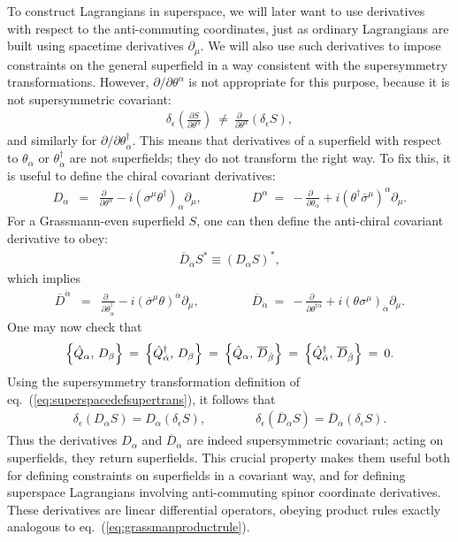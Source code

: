 \documentclass[11pt]{article}
\def\beq{\begin{eqnarray}}
\def\eeq{\end{eqnarray}}
\def\sigmabar{\overline\sigma}
\def\Dcon{\overline D}
\begin{document}
To construct Lagrangians in superspace, we will later want to use 
derivatives with respect to the anti-commuting coordinates, just as 
ordinary Lagrangians are built using spacetime derivatives 
$\partial_\mu$. We will also use such derivatives to impose constraints 
on the general superfield in a way consistent with the supersymmetry 
transformations. However, $
\partial
/
\partial\theta^\alpha
$ is not appropriate for 
this purpose, because it is not supersymmetric covariant:
\beq
\delta_\epsilon \left (\frac{\partial S}{\partial \theta^\alpha} \right )
\>\not=\>
\frac{\partial\phantom{x}}{\partial\theta^\alpha} (\delta_\epsilon S),
\eeq
and similarly for 
$
\partial
/
\partial\theta^\dagger_{\dot\alpha}
$. This means
that derivatives of a superfield with respect to 
$\theta_\alpha$ or $\theta^\dagger_{\dot\alpha}$ are not superfields; they do not transform the right way.
To fix this, it is useful to define the chiral covariant derivatives:
\beq
D_\alpha &=& \frac{\partial\phantom{x}}{\partial\theta^\alpha} 
-i (\sigma^\mu \theta^\dagger)_\alpha \partial_\mu
,
\qquad\qquad
D^\alpha \>=\> -\frac{\partial\phantom{x}}{\partial\theta_\alpha} 
+i (\theta^\dagger \sigmabar^\mu)^\alpha \partial_\mu
.
\eeq
For a Grassmann-even superfield $S$, one can then define the anti-chiral covariant derivative to obey:
\beq
\Dcon_{\dot\alpha} S^* \equiv (D_\alpha S)^*,
\label{eq:defDcon}
\eeq
which implies
\beq
\Dcon^{\dot\alpha} &=& 
\frac{\partial\phantom{x}}{\partial\theta^\dagger_{\dot\alpha}} 
-i (\sigmabar^\mu \theta)^{\dot\alpha} \partial_\mu
,
\qquad\qquad\>
\Dcon_{\dot\alpha} \>=\> 
-\frac{\partial\phantom{x}}{\partial\theta^{\dagger\dot\alpha}} 
+i (\theta \sigma^\mu)_{\dot\alpha} \partial_\mu
.
\eeq
One may now check that
\beq
\Bigl \lbrace \hat Q_\alpha ,\, D_\beta \Bigr \rbrace \>=\>
\Bigl \lbrace \hat Q^\dagger_{\dot\alpha} ,\, D_\beta \Bigr \rbrace \>=\>
\Bigl \lbrace \hat Q_\alpha ,\, \Dcon_{\dot\beta} \Bigr \rbrace \>=\>
\Bigl \lbrace \hat Q^\dagger_{\dot\alpha} ,\, \Dcon_{\dot\beta} 
\Bigr \rbrace \>=\> 0 .
\label{eq:QDanticommute}
\eeq
Using the supersymmetry transformation definition of eq.~(\ref{eq:superspacedefsupertrans}), it follows that
\beq
\delta_\epsilon \left ( D_\alpha S \right )
= D_\alpha\left ( \delta_\epsilon  S \right ),
\qquad
\qquad
\delta_\epsilon \left ( \Dcon_{\dot\alpha} S \right )
= \Dcon_{\dot\alpha} \left ( \delta_\epsilon  S \right )
.
\label{eq:Dsupercon}
\eeq
Thus the derivatives $D_\alpha$ and $\Dcon_{\dot\alpha}$ are indeed 
supersymmetric covariant; acting on superfields, they return superfields. 
This crucial property makes them useful both for defining constraints on superfields in a 
covariant way, and for defining superspace Lagrangians involving 
anti-commuting spinor coordinate derivatives. These derivatives are linear differential operators, obeying product rules
exactly analogous to eq.~(\ref{eq:grassmanproductrule}).
\end{document}
